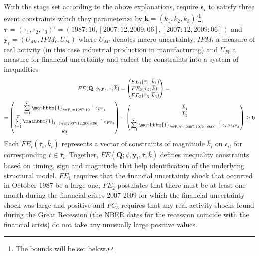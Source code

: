 \documentclass[a4paper,11pt,listof=nochaptergap,oneside,pointednumbers,bibtotoc,bigheadings,liststotoc]{scrbook}
\theoremstyle{mysatz}
\theoremstyle{mydefinition}
\theoremstyle{mybemerkung}
\newcommand{\vect}[1]{\boldsymbol{\mathbf{#1}}}
\begin{document}
\\
\\
With the stage set according to the above explanations, \citet{ludvigsonetal:18} require $\vect{\epsilon}_t$ to satisfy three event constraints which they parameterize by $\overline{\vect{k}} = (\overline{k}_1, \overline{k}_2, \overline{k}_3)'$\footnote{The bounds will be set below.}, $\overline{\vect{\tau}} = (\overline{\tau}_1, \overline{\tau}_2, \overline{\tau}_3)' = (1987:10, [2007:12, 2009:06], [2007:12, 2009:06])$ and $\vect{y}_t = (U_{Mt}, IPM_{t}, U_{Ft})$ where $U_{Mt}$ denotes macro uncertainty, $IPM_{t}$ a measure of real activity (in this case industrial production in manufacturing) and $U_{Ft}$ a measure for financial uncertainty and collect the constraints into a system of inequalities
\begin{equation} \label{eq:svar_ludvi12}
\begin{split}
	FE(\vect{Q}; \phi, \vect{y}_t, \overline{\tau}, \overline{k}) & = \begin{pmatrix}
	FE_1(\overline{\tau}_1, \overline{k}_1)\\
	 FE_2(\overline{\tau}_2, \overline{k}), \\
	 FE_3(\overline{\tau}_3, \overline{k}_3)
	\end{pmatrix} = \\
	= \begin{pmatrix}
	\sum\limits_{t=1}^T \mathbbm{1}_{t = \overline{\tau}_1= 1987:10} \dot \quad \epsilon_{F\overline{\tau}_1}  \\
	 \sum\limits_{t=1}^T \mathbbm{1}_{t = \overline{\tau}_2 \in [2007:12, 2009:06]} \dot \quad \epsilon_{F\overline{\tau}_2}  \\
	\overline{k}_3
	\end{pmatrix} & - 
	\begin{pmatrix}
	\overline{k}_1\\
	\overline{k}_2  \\
	\sum\limits_{t=1}^T \mathbbm{1}_{t = \overline{\tau}_3 \forall \in [2007:12, 2009:06]} \dot \quad \epsilon_{IPM\overline{\tau}_3} 
	\end{pmatrix} \geq \vect{0}
\end{split}								
\end{equation}
Each $FE_i(\overline{\tau}_i, \overline{k}_i)$ represents a vector of constraints of magnitude $\overline{k}_i$ on $\epsilon_{it}$ for corresponding $t \in \overline{\tau}_i$. Together, $FE(\vect{Q}; \phi, \vect{y}_t, \overline{\tau}, \overline{k})$ defines inequality constraints based on timing, sign and magnitude that help identification of the underlying structural model. $FE_1$ requires that the financial uncertainty shock that occurred in October 1987 be a large one; $FE_2$ postulates that there must be at least one month during the financial crises 2007-2009 for which the financial uncertainty shock was large and positive and $FC_3$ requires that any real activity shocks found during the Great Recession (the NBER dates for the recession coincide with the financial crisis) do not take any unusually large positive values.\\
\end{document}
